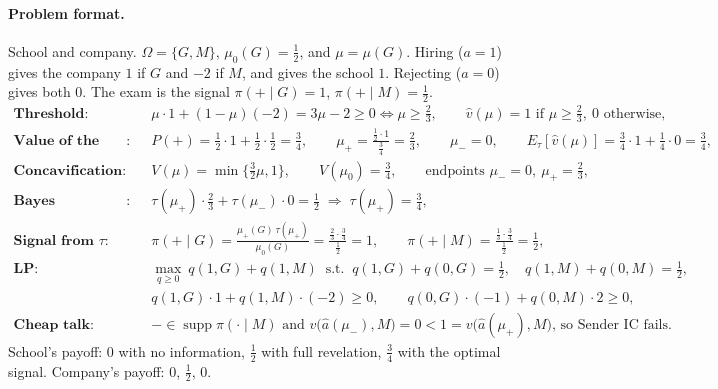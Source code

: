 \documentclass{article}
\begin{document}
\paragraph{Problem format.}
School and company. $\Omega=\{G,M\}$, $\mu_0(G)=\tfrac12$, and $\mu=\mu(G)$. Hiring ($a=1$) gives the company $1$ if $G$ and $-2$ if $M$, and gives the school $1$. Rejecting ($a=0$) gives both $0$.
The exam is the signal $\pi(+\mid G)=1$, $\pi(+\mid M)=\tfrac12$.
\begin{align*}
    \textbf{Threshold}:&\quad \mu\cdot 1+(1-\mu)(-2)=3\mu-2\ge 0\iff\mu\ge\tfrac23,\qquad \hat v(\mu)=1\text{ if }\mu\ge\tfrac23,\ 0\text{ otherwise},\\
    \textbf{Value of the exam}:&\quad P(+)=\tfrac12\cdot 1+\tfrac12\cdot\tfrac12=\tfrac34,\qquad \mu_+=\frac{\tfrac12\cdot 1}{\tfrac34}=\tfrac23,\qquad \mu_-=0,\qquad E_\tau[\hat v(\mu)]=\tfrac34\cdot 1+\tfrac14\cdot 0=\tfrac34,\\
    \textbf{Concavification}:&\quad V(\mu)=\min\{\tfrac32\mu,1\},\qquad V(\mu_0)=\tfrac34,\qquad \text{endpoints }\mu_-=0,\ \mu_+=\tfrac23,\\
    \textbf{Bayes plausibility}:&\quad \tau(\mu_+)\cdot\tfrac23+\tau(\mu_-)\cdot 0=\tfrac12\;\Rightarrow\;\tau(\mu_+)=\tfrac34,\\
    \textbf{Signal from }\tau:&\quad \pi(+\mid G)=\frac{\mu_+(G)\,\tau(\mu_+)}{\mu_0(G)}=\frac{\tfrac23\cdot\tfrac34}{\tfrac12}=1,\qquad \pi(+\mid M)=\frac{\tfrac13\cdot\tfrac34}{\tfrac12}=\tfrac12,\\
    \textbf{LP}:&\quad \max_{q\ge 0}\ q(1,G)+q(1,M)\;\;\text{s.t.}\;\;q(1,G)+q(0,G)=\tfrac12,\quad q(1,M)+q(0,M)=\tfrac12,\\
    &\quad q(1,G)\cdot 1+q(1,M)\cdot(-2)\ge 0,\qquad q(0,G)\cdot(-1)+q(0,M)\cdot 2\ge 0,\\
    \textbf{Cheap talk}:&\quad -\in\operatorname{supp}\pi(\cdot\mid M)\text{ and }v\big(\hat a(\mu_-),M\big)=0<1=v\big(\hat a(\mu_+),M\big)\text{, so Sender IC fails}.
\end{align*}
School's payoff: $0$ with no information, $\tfrac12$ with full revelation, $\tfrac34$ with the optimal signal. Company's payoff: $0$, $\tfrac12$, $0$.
\end{document}
